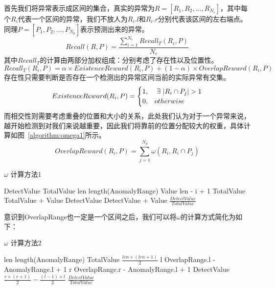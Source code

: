 首先我们将异常表示成区间的集合，真实的异常为$R=[R_1,R_2,\dots,R_{N_r}]$，其中每个$R_i$代表一个区间的异常，我们不放人为$R_i.l$和$R_i.r$分别代表该区间的左右端点。同理$P=[P_1,P_2,\dots,P_{N_p}]$表示预测出来的异常。
\begin{equation}
  Recall(R,P) = \frac{\sum_{i=1}^{N_r} Recall_T(R_i,P)}{N_r}
\end{equation}
其中$Recall_T$的计算由两部分加权组成：分别考虑了存在性以及位置性。
\begin{equation}
  Recall_T(R_i,P) = \alpha \times ExistenceReward(R_i,P) + (1-\alpha) \times OverlapReward (R_i,P)
\end{equation}
存在性只需要判断是否存在一个检测出的异常区间当前的实际异常有交集。
\begin{equation}
ExistenceReward(R_i,P) = \begin{cases} 1, & \ \exists \  | R_i \cap P_j|>1 \cr 0, & otherwise \end{cases}
\end{equation}
而相交性则需要考虑重叠的位置和大小的关系，此处我们认为对于一个异常来说，越开始检测到对我们来说越重要，因此我们将靠前的位置分配较大的权重，具体计算如图~\ref{algorithm:omega1}所示。
\begin{equation}
  OverlapReward(R_i,P) = \sum_{j=1}^{N_p}\omega(R_i,R_i\cap P_j)
\end{equation}
\begin{algorithm}
  \caption{$\omega$ 计算方法1}
  \begin{algorithmic}
      \State DetectValue 
      \State TotalValue 
      \State len \gets length(AnomalyRange)
          \State Value \gets len - i + 1
          \State TotalValue \gets TotalValue + Value
              \State DetectValue \gets DetectValue + Value
          \EndIf
      \EndFor
      \State \Return $\frac{DetectValue}{TotalValue}$
      \EndFunction
  \end{algorithmic}
  \label{algorithm:omega1}
\end{algorithm}
意识到OverlapRange也一定是一个区间之后，我们可以将$\omega$的计算方式简化为如下：
  \begin{algorithm}
    \caption{$\omega$ 计算方法2}
    \begin{algorithmic}
        \State len \gets length(AnomalyRange)
        \State TotalValue \gets $\frac{len \times (len + 1)}{2}$
        \State l \gets OverlapRange.l - AnomalyRange.l + 1
        \State r \gets OverlapRange.r - AnomalyRange.l + 1
        \State DetectValue \gets $\frac{r \times (r+1)}{2} - \frac{(l-1) \times l}{2}$
        \State \Return $\frac{DetectValue}{TotalValue}$
        \EndFunction
    \end{algorithmic}
    \label{algorithm:omega2}
  \end{algorithm}

